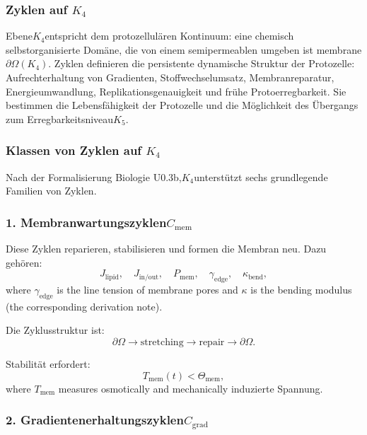 
\subsubsection{Zyklen auf \texorpdfstring{$K_4$}{K_4}}
\label{sec:cycles-k4}

Ebene$K_4$entspricht dem protozellulären Kontinuum:
eine chemisch selbstorganisierte Domäne, die von einem semipermeablen umgeben ist
membrane $\partial\Omega(K_4)$.
Zyklen definieren die persistente dynamische Struktur der Protozelle:
Aufrechterhaltung von Gradienten, Stoffwechselumsatz, Membranreparatur,
Energieumwandlung, Replikationsgenauigkeit und frühe Protoerregbarkeit.
Sie bestimmen die Lebensfähigkeit der Protozelle und die Möglichkeit
des Übergangs zum Erregbarkeitsniveau$K_5$.

\subsubsection{Klassen von Zyklen auf \texorpdfstring{$K_4$}{K_4}}

Nach der Formalisierung Biologie U0.3b,$K_4$unterstützt sechs
grundlegende Familien von Zyklen.

\subsubsection{1. Membranwartungszyklen$C_{\mathrm{mem}}$}

Diese Zyklen reparieren, stabilisieren und formen die Membran neu.
Dazu gehören:
\[
  J_{\mathrm{lipid}},\quad
  J_{\mathrm{in/out}},\quad
  P_{\mathrm{mem}},\quad
  \gamma_{\mathrm{edge}},\quad
  \kappa_{\mathrm{bend}},
\]
where $\gamma_{\mathrm{edge}}$ is the line tension of membrane pores
and $\kappa$ is the bending modulus (the corresponding derivation note).

Die Zyklusstruktur ist:
\[
  \partial\Omega \to 
  \mathrm{stretching} \to 
  \mathrm{repair} \to 
  \partial\Omega.
\]

Stabilität erfordert:
\[
  T_{\mathrm{mem}}(t) < \Theta_{\mathrm{mem}},
\]
where $T_{\mathrm{mem}}$ measures osmotically and mechanically
induzierte Spannung.

\subsubsection{2. Gradientenerhaltungszyklen$C_{\mathrm{grad}}$}

